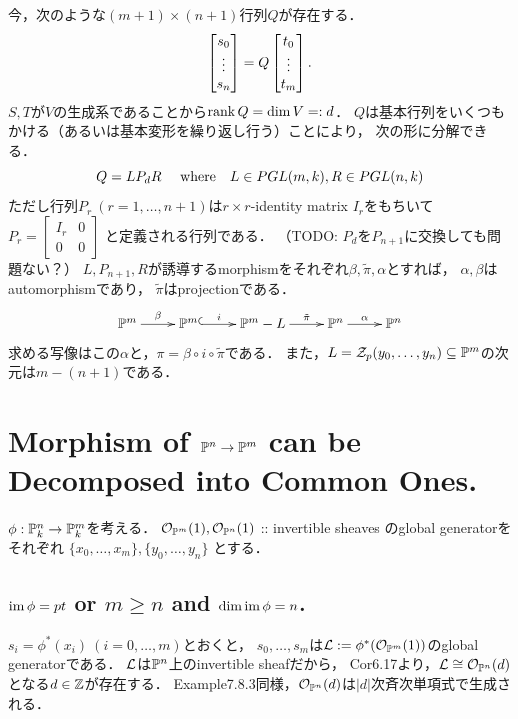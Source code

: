 \documentclass[a4paper]{jsarticle}
\begin{document}
    今，次のような$(m+1) \times (n+1)$行列$Q$が存在する．
    \[
        \begin{bmatrix} s_0 \\ \vdots \\ s_n \end{bmatrix}
        =Q \begin{bmatrix} t_0 \\ \vdots \\ t_m \end{bmatrix}.
    \]
    $S,T$が$V$の生成系であることから$\operatorname{rank} Q=\dim V=:d$．
    $Q$は基本行列をいくつもかける（あるいは基本変形を繰り返し行う）ことにより，
    次の形に分解できる．
    \[
        Q=L P_{d} R~~
        ~~\text{where}~~~ L \in PGL(m,k), R \in PGL(n,k)
    \]
    ただし行列$P_r ~(r=1,\dots,n+1)$は$r \times r$-identity matrix $I_r$をもちいて
    $P_{r}=
    \begin{bmatrix}
        I_r & 0 \\
        0 & 0
    \end{bmatrix}$
    と定義される行列である．
    （TODO: $P_{d}$を$P_{n+1}$に交換しても問題ない？）
    $L, P_{n+1}, R$が誘導するmorphismをそれぞれ$\beta, \tilde{\pi} ,\alpha$とすれば，
    $\alpha, \beta$はautomorphismであり，
    $\tilde{\pi}$はprojectionである．
    \[
        \xymatrix
        {
            \proj^m \ar[r]^-{\beta}& \proj^m
            \ar@{^{(}->}[r]^-{i}& \proj^m-L
            \ar[r]^-{\tilde{\pi}}& \proj^n
            \ar[r]^-{\alpha}& \proj^n
        }
    \]
    求める写像はこの$\alpha$と，$\pi=\beta \circ i \circ \tilde{\pi}$である．
    また，$L=\mathcal{Z}_p(y_0,\dots,y_n) \subseteq \mathbb{P}^m$の次元は$m-(n+1)$である．

\section{Morphism of $\mathbb{P}^n \to \mathbb{P}^m$ can be Decomposed into Common Ones.} %
    $\phi: \mathbb{P}^n_k \to \mathbb{P}^m_k$を考える．
    $\mathcal{O}_{\mathbb{P}^m}(1), \mathcal{O}_{\mathbb{P}^n}(1)$
     :: invertible sheaves
    のglobal generatorをそれぞれ
    $\{x_0,\dots,x_m\}, \{y_0,\dots,y_n\}$
    とする．

    \subsection{$\operatorname{im} \phi=pt$ or $m \geq n$ and $\dim \operatorname{im} \phi=n$.}
    $s_i=\phi^*(x_i)~(i=0,\dots,m)$とおくと，
    $s_0,\dots,s_m$は$\mathcal{L}:=\phi^*(\mathcal{O}_{\mathbb{P}^m}(1))$のglobal generatorである．
    $\mathcal{L}$は$\mathbb{P}^n$上のinvertible sheafだから，
    Cor6.17より，$\mathcal{L} \cong \mathcal{O}_{\mathbb{P}^n}(d)$となる$d \in \mathbb{Z}$が存在する．
    Example7.8.3同様，$\mathcal{O}_{\mathbb{P}^n}(d)$は$|d|$次斉次単項式で生成される．
\end{document}
